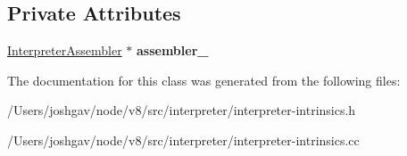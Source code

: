 \subsection*{Private Attributes}
\begin{DoxyCompactItemize}
\item 
\hyperlink{classv8_1_1internal_1_1interpreter_1_1_interpreter_assembler}{Interpreter\+Assembler} $\ast$ {\bfseries assembler\+\_\+}\hypertarget{classv8_1_1internal_1_1interpreter_1_1_intrinsics_helper_aacef127a3fda2b1b01ff418b02fd8717}{}\label{classv8_1_1internal_1_1interpreter_1_1_intrinsics_helper_aacef127a3fda2b1b01ff418b02fd8717}

\end{DoxyCompactItemize}


The documentation for this class was generated from the following files\+:\begin{DoxyCompactItemize}
\item 
/\+Users/joshgav/node/v8/src/interpreter/interpreter-\/intrinsics.\+h\item 
/\+Users/joshgav/node/v8/src/interpreter/interpreter-\/intrinsics.\+cc\end{DoxyCompactItemize}
